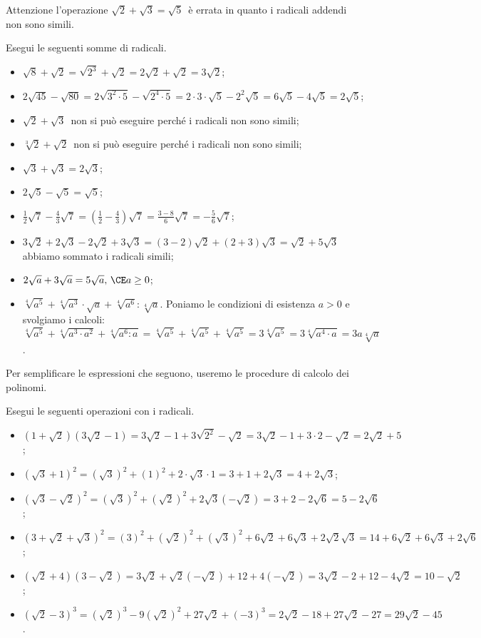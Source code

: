 Attenzione l'operazione $\sqrt 2+\sqrt 3=\sqrt 5$\, è errata in quanto i radicali addendi non sono simili.
\begin{exrig}
 \begin{esempio}
Esegui le seguenti somme di radicali.
\begin{itemize}
 \item $\sqrt 8+\sqrt 2=\sqrt{2^3}+\sqrt 2=2\sqrt 2+\sqrt 2=3\sqrt 2$;
 \item $2\sqrt{45}-\sqrt{80}=2\sqrt{3^2\cdot 5}-\sqrt{2^4\cdot 5}=2\cdot 3\cdot \sqrt 5-2^2\sqrt 5=6\sqrt 5-4\sqrt 5=2\sqrt 5$;
 \item $\sqrt 2+\sqrt 3$\, non si può eseguire perché i radicali non sono simili;
 \item $\sqrt[3]2+\sqrt 2$\, non si può eseguire perché i radicali non sono simili;
 \item $\sqrt 3+\sqrt 3=2\sqrt 3$;
 \item $2\sqrt 5-\sqrt 5=\sqrt 5$;
 \item $\frac 1 2\sqrt 7-\frac 4 3\sqrt 7=\left(\frac 1 2-\frac 4 3\right)\sqrt 7=\frac{3-8} 6\sqrt 7=-\frac 5 6\sqrt 7$;
 \item $3\sqrt 2+2\sqrt 3-2\sqrt 2+3\sqrt 3=(3-2)\sqrt 2+(2+3)\sqrt 3=\sqrt 2+5\sqrt 3$\, abbiamo sommato i radicali simili;
 \item $2\sqrt a+3\sqrt a=5\sqrt a,\,\CE a\ge 0$;
 \item $\sqrt[4]{a^5}+\sqrt[4]{a^3}\cdot \sqrt a+\sqrt[4]{a^6}:\sqrt[4]a$. Poniamo le condizioni di esistenza $a>0$ e svolgiamo i calcoli: $\sqrt[4]{a^5}+\sqrt[4]{a^3\cdot a^2}+\sqrt[4]{a^6:a}=\sqrt[4]{a^5}+\sqrt[4]{a^5}+\sqrt[4]{a^5}=3\sqrt[4]{a^5}=3\sqrt[4]{a^4\cdot a}=3a\sqrt[4]a$.
\end{itemize}
 \end{esempio}
\end{exrig}
Per semplificare le espressioni che seguono, useremo le procedure di calcolo dei polinomi.
\begin{exrig}
 \begin{esempio}
Esegui le seguenti operazioni con i radicali.
\begin{itemize}
 \item $(1+\sqrt 2)(3\sqrt 2-1)=3\sqrt 2-1+3\sqrt {2^2}-\sqrt 2=3\sqrt 2-1+3\cdot 2-\sqrt 2=2\sqrt 2+5$;
 \item $(\sqrt 3+1)^2=(\sqrt 3)^2+(1)^2+2\cdot \sqrt 3\cdot 1=3+1+2\sqrt 3=4+2\sqrt 3$;
 \item $(\sqrt 3-\sqrt 2)^2=(\sqrt 3)^2+(\sqrt 2)^2+2 \sqrt 3 (-\sqrt 2)=3+2-2\sqrt 6=5-2\sqrt 6$;
 \item $(3+\sqrt 2+\sqrt 3)^2=(3)^2+(\sqrt 2)^2+(\sqrt 3)^2+6 \sqrt 2+6 \sqrt 3+2 \sqrt 2 \sqrt 3=14+6\sqrt 2+6\sqrt 3+2\sqrt 6$;
 \item $(\sqrt 2+4)(3-\sqrt 2)=3\sqrt 2 +\sqrt 2(-\sqrt 2)+12+4(-\sqrt 2)=3\sqrt 2-2+12-4\sqrt 2=10-\sqrt 2$;
 \item $(\sqrt 2-3)^3=(\sqrt 2)^3-9(\sqrt 2)^2+27\sqrt 2+(-3)^3=2\sqrt 2-18+27\sqrt 2-27=29\sqrt 2-45$.
\end{itemize}
 \end{esempio}
\end{exrig}
